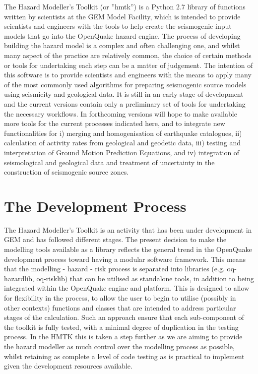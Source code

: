 The Hazard Modeller's Toolkit (or ''hmtk'') is a Python 2.7 library of functions written by scientists at the GEM Model Facility, which is intended to provide 
scientists and engineers with the tools to help create the seismogenic 
input models that go into the OpenQuake hazard engine. The process of 
developing building the hazard model is a complex and often challenging 
one, and whilst many aspect of the practice are relatively common, the 
choice of certain methods or tools for undertaking each step can be a 
matter of judgement. The intention of this software is to provide 
scientists and engineers with the means to apply many of the most 
commonly used algorithms for preparing seismogenic source models 
using seismicity and geological data. It is still in an early 
stage of development and the current versions contain only a preliminary
set of tools for undertaking the necessary workflows. In forthcoming 
versions will hope to make available more tools for the current processes
indicated here, and to integrate new functionalities for i) merging and
homogenisation of earthquake catalogues, ii) calculation of activity 
rates from geological and geodetic data, iii) testing and interpretation
of Ground Motion Prediction Equations, and iv) integration of 
seismological and geological data and treatment of uncertainty 
in the construction of seismogenic source zones.

\section{The Development Process}

The Hazard Modeller's Toolkit is an activity that has been under development in GEM and has followed different stages. The present decision to make the modelling tools available as a library reflects the general trend in the OpenQuake development process toward having a modular software framework. This means that the modelling - hazard - risk process is separated into libraries (e.g. oq-hazardlib, oq-risklib) that can be utilised as standalone tools, in addition to being integrated within the OpenQuake engine and platform. This is designed to allow for flexibility in the process, to allow the user to begin to utilise (possibly in other contexts) functions and classes that are intended to address particular stages of the calculation. Such an approach ensure that each sub-component of the toolkit is fully tested, with a minimal degree of duplication in the testing process. In the HMTK this is taken a step further as we are aiming to provide the hazard modeller as much control over the modelling process as possible, whilst retaining as complete a level of code testing as is practical to implement given the development resources available. 

